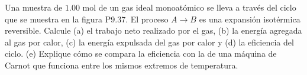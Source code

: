 \item Una muestra de $1.00\text{ mol}$ de un gas ideal monoatómico se lleva a través del ciclo que se muestra en la figura P9.37. El proceso $A \rightarrow B$ es una expansión isotérmica reversible. Calcule (a) el trabajo neto realizado por el gas, (b) la energía agregada al gas por calor, (c) la energía expulsada del gas por calor y (d) la eficiencia del ciclo. (e) Explique cómo se compara la eficiencia con la de una máquina de Carnot que funciona entre los mismos extremos de temperatura.
